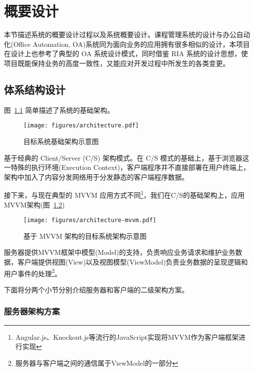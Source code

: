 \chapter{概要设计}

本节描述系统的概要设计过程以及系统概要设计。课程管理系统的设计与办公自动化(Office Automation, OA)系统同为面向业务的应用拥有很多相似的设计，本项目在设计上也参考了典型的 OA 系统设计模式，同时借鉴 RIA 系统的设计思想，使项目既能保持业务的高度一致性，又能应对开发过程中所发生的各类变更。

\section{体系结构设计}

图~\ref{Architecture} 简单描述了系统的基础架构。

\begin{figure}[!h]
  \begin{center}
    \texttt{[image: figures/architecture.pdf]}
    \caption{目标系统基础架构示意图\label{Architecture}}
  \end{center}
\end{figure}

基于经典的 Client/Server (C/S) 架构模式。在 C/S 模式的基础上，基于浏览器这一特殊的执行环境(Execution Context)，客户端程序并不直接部署在用户终端上，架构中加入了内容分发网络用于分发静态的客户端程序数据。

接下来，与现在典型的 MVVM 应用方式不同\footnote{Angular.js、Knockout.js等流行的JavaScript实现将MVVM作为客户端框架进行实现}，我们在C/S的基础架构上，应用MVVM架构(图~\ref{ArchitectureMVVM})

\begin{figure}[!h]
  \begin{center}
    \texttt{[image: figures/architecture-mvvm.pdf]}
    \caption{基于 MVVM 架构的目标系统架构示意图\label{ArchitectureMVVM}}
  \end{center}
\end{figure}

服务器提供MVVM框架中模型(Model)的支持，负责响应业务请求和维护业务数据，客户端提供视图(View)以及视图模型(ViewModel)负责业务数据的呈现逻辑和用户事件的处理\footnote{服务器与客户端之间的通信属于ViewModel的一部分}。

下面将分两个小节分别介绍服务器和客户端的二级架构方案。

\subsection{服务器架构方案}

